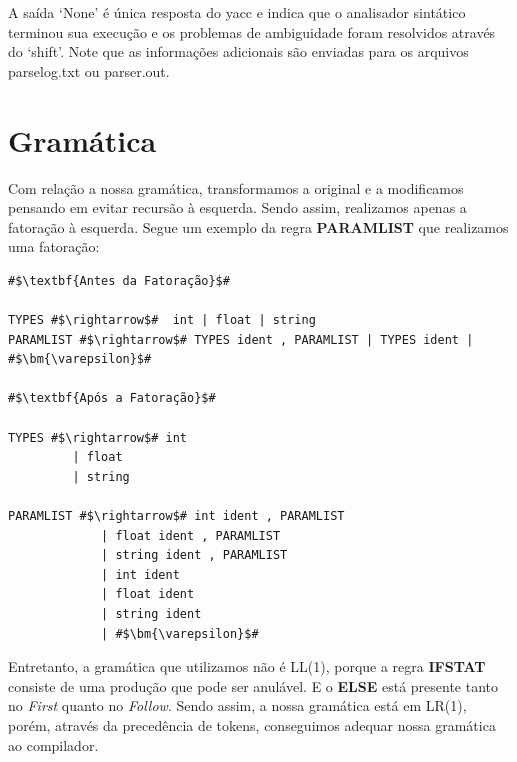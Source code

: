 \documentclass[
	12pt,				%
	openright,			%
	twoside,			%
	a4paper,			%
	english,			%
	french,				%
	spanish,			%
	brazil				%
	]{abntex2}
\begin{document}
A saída `None' é única resposta do yacc e indica que o analisador sintático terminou sua execução e os
problemas de ambiguidade foram resolvidos através do `shift'. Note que as informações adicionais
são enviadas para os arquivos parselog.txt ou parser.out. 
\chapter{Gramática}

Com relação a nossa gramática, transformamos a original e a modificamos pensando em
evitar recursão à esquerda. Sendo assim, realizamos apenas a fatoração à esquerda.
Segue um exemplo da regra \textbf{PARAMLIST} que realizamos uma fatoração:
\begin{lstlisting}[escapechar=\#]
#$\textbf{Antes da Fatoração}$#

TYPES #$\rightarrow$#  int | float | string 
PARAMLIST #$\rightarrow$# TYPES ident , PARAMLIST | TYPES ident | #$\bm{\varepsilon}$#  

#$\textbf{Após a Fatoração}$#

TYPES #$\rightarrow$# int 
         | float 
         | string 

PARAMLIST #$\rightarrow$# int ident , PARAMLIST 
             | float ident , PARAMLIST 
             | string ident , PARAMLIST 
             | int ident 
             | float ident 
             | string ident 
             | #$\bm{\varepsilon}$#  
\end{lstlisting}

Entretanto, a gramática que utilizamos não é LL(1), porque a regra
\textbf{IFSTAT} consiste de uma produção que pode ser anulável. E o \textbf{ELSE}
está presente tanto no \emph{First} quanto no \emph{Follow}. Sendo assim, a nossa gramática está em
LR(1), porém, através da precedência de tokens, conseguimos adequar nossa gramática ao
compilador.
\end{document}
